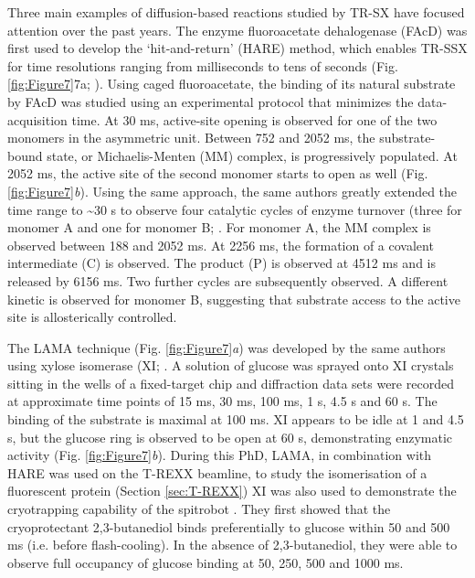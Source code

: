 Three main examples of diffusion-based reactions studied by TR-SX have focused attention over the past years. The enzyme fluoroacetate dehalogenase (FAcD) was first used to develop the ‘hit-and-return’ (HARE) method, which enables TR-SSX for time resolutions ranging from milliseconds to tens of seconds (Fig. \ref{fig:Figure7}7a; \cite{schulzHitandreturnSystemEnables2018}). Using caged fluoroacetate, the binding of its natural substrate by FAcD was studied using an experimental protocol that minimizes the data-acquisition time. At 30 ms, active-site opening is observed for one of the two monomers in the asymmetric unit. Between 752 and 2052 ms, the substrate-bound state, or Michaelis-Menten (MM) complex, is progressively populated. At 2052 ms, the active site of the second monomer starts to open as well (Fig. \ref{fig:Figure7}\textit{b}). Using the same approach, the same authors greatly extended the time range to \textasciitilde30 s to observe four catalytic cycles of enzyme turnover (three for monomer A and one for monomer B; \cite{mehrabiLiquidApplicationMethod2019}. For monomer A, the MM complex is observed between 188 and 2052 ms. At 2256 ms, the formation of a covalent intermediate (C) is observed. The product (P) is observed at 4512 ms and is released by 6156 ms. Two further cycles are subsequently observed. A different kinetic is observed for monomer B, suggesting that substrate access to the active site is allosterically controlled.

The LAMA technique (Fig. \ref{fig:Figure7}\textit{a}) was developed by the same authors using xylose isomerase (XI; \cite{mehrabiTimeresolvedCrystallographyReveals2019}. A solution of glucose was sprayed onto XI crystals sitting in the wells of a fixed-target chip and diffraction data sets were recorded at approximate time points of 15 ms, 30 ms, 100 ms, 1 s, 4.5 s and 60 s. The binding of the substrate is maximal at 100 ms. XI appears to be idle at 1 and 4.5 s, but the glucose ring is observed to be open at 60 s, demonstrating enzymatic activity (Fig. \ref{fig:Figure7}\textit{b}). During this PhD, LAMA, in combination with HARE was used on the T-REXX beamline, to study the isomerisation of a fluorescent protein (Section \ref{sec:T-REXX}) XI was also used to demonstrate the cryotrapping capability of the spitrobot \parencite{mehrabiMillisecondCryotrappingSpitrobot2023}. They first showed that the cryoprotectant 2,3-butanediol binds preferentially to glucose within 50 and 500 ms (i.e. before flash-cooling). In the absence of 2,3-butanediol, they were able to observe full occupancy of glucose binding at 50, 250, 500 and 1000 ms.

